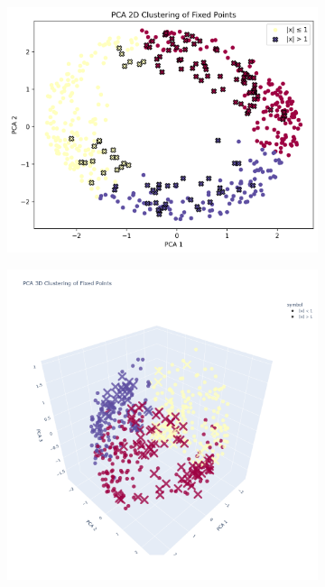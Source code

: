 \documentclass[a4paper,12pt]{article}
\begin{document}
\begin{figure}[tp]
\centering
\begin{subfigure}{0.45\textwidth}
	\includegraphics[width=\textwidth,height=\textwidth]{stable-PCA-2D-flagged}
	\caption{}
\end{subfigure}
\hfill
\begin{subfigure}{0.45\textwidth}
	\includegraphics[width=\textwidth,height=\textwidth]{stable-PCA-3D-flagged}

\end{subfigure}
\end{figure}
\end{document}
